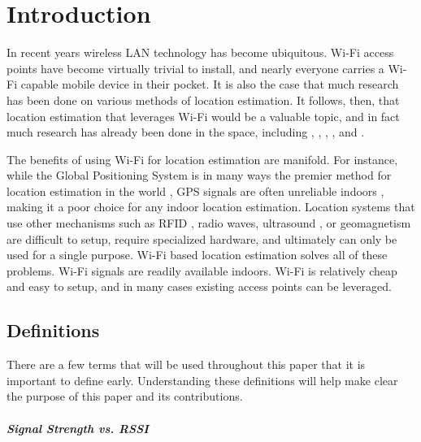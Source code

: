 \chapter{Introduction}
\label{introduction}
%


In recent years wireless LAN technology has become ubiquitous. Wi-Fi access points have become virtually trivial to install, and nearly everyone carries a Wi-Fi capable mobile device in their pocket. It is also the case that much research has been done on various methods of location estimation. It follows, then, that location estimation that leverages Wi-Fi would be a valuable topic, and in fact much research has already been done in the space, including \cite{ito2005bayesian}, \cite{liu2007survey}, \cite{kawaguchi2009wifi}, \cite{hotta2012robust}, and \cite{nagaosa2012dept}. 

The benefits of using Wi-Fi for location estimation are manifold. For instance, while the Global Positioning System is in many ways the premier method for location estimation in the world \cite{bajaj2002gps}, GPS signals are often unreliable indoors \cite{xiong2012towards}, making it a poor choice for any indoor location estimation. Location systems that use other mechanisms such as RFID \cite{toplan2012rfid}, radio waves, ultrasound \cite{priyantha2005cricket}, or geomagnetism \cite{chung2011indoor} are difficult to setup, require specialized hardware, and ultimately can only be used for a single purpose. Wi-Fi based location estimation solves all of these problems. Wi-Fi signals are readily available indoors. Wi-Fi is relatively cheap and easy to setup, and in many cases existing access points can be leveraged.

\section{Definitions}
%

There are a few terms that will be used throughout this paper that it is important to define early. Understanding these definitions will help make clear the purpose of this paper and its contributions. 

\paragraph{Signal Strength vs. RSSI}

